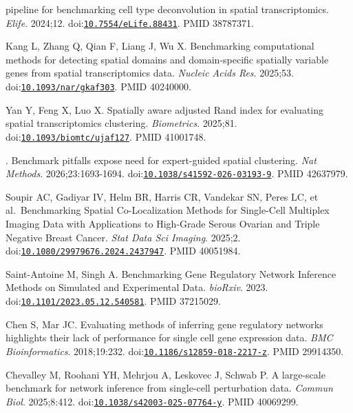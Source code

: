 \documentclass[11pt]{article}
\begin{document}
\begin{enumerate}[label={[\arabic*]},leftmargin=2.6em,labelsep=0.5em,itemsep=1.5pt]
  pipeline for benchmarking cell type deconvolution in spatial
  transcriptomics. \emph{Elife}. 2024;12.
  doi:\href{https://doi.org/10.7554/eLife.88431}{\nolinkurl{10.7554/eLife.88431}}.
  PMID 38787371.
\item
  Kang L, Zhang Q, Qian F, Liang J, Wu X. Benchmarking computational
  methods for detecting spatial domains and domain-specific spatially
  variable genes from spatial transcriptomics data. \emph{Nucleic Acids
  Res}. 2025;53.
  doi:\href{https://doi.org/10.1093/nar/gkaf303}{\nolinkurl{10.1093/nar/gkaf303}}.
  PMID 40240000.
\item
  Yan Y, Feng X, Luo X. Spatially aware adjusted Rand index for
  evaluating spatial transcriptomics clustering. \emph{Biometrics}.
  2025;81.
  doi:\href{https://doi.org/10.1093/biomtc/ujaf127}{\nolinkurl{10.1093/biomtc/ujaf127}}.
  PMID 41001748.
\item
  . Benchmark pitfalls expose need for expert-guided spatial clustering.
  \emph{Nat Methods}. 2026;23:1693-1694.
  doi:\href{https://doi.org/10.1038/s41592-026-03193-9}{\nolinkurl{10.1038/s41592-026-03193-9}}.
  PMID 42637979.
\item
  Soupir AC, Gadiyar IV, Helm BR, Harris CR, Vandekar SN, Peres LC, et
  al.~Benchmarking Spatial Co-Localization Methods for Single-Cell
  Multiplex Imaging Data with Applications to High-Grade Serous Ovarian
  and Triple Negative Breast Cancer. \emph{Stat Data Sci Imaging}.
  2025;2.
  doi:\href{https://doi.org/10.1080/29979676.2024.2437947}{\nolinkurl{10.1080/29979676.2024.2437947}}.
  PMID 40051984.
\item
  Saint-Antoine M, Singh A. Benchmarking Gene Regulatory Network
  Inference Methods on Simulated and Experimental Data. \emph{bioRxiv}.
  2023.
  doi:\href{https://doi.org/10.1101/2023.05.12.540581}{\nolinkurl{10.1101/2023.05.12.540581}}.
  PMID 37215029.
\item
  Chen S, Mar JC. Evaluating methods of inferring gene regulatory
  networks highlights their lack of performance for single cell gene
  expression data. \emph{BMC Bioinformatics}. 2018;19:232.
  doi:\href{https://doi.org/10.1186/s12859-018-2217-z}{\nolinkurl{10.1186/s12859-018-2217-z}}.
  PMID 29914350.
\item
  Chevalley M, Roohani YH, Mehrjou A, Leskovec J, Schwab P. A
  large-scale benchmark for network inference from single-cell
  perturbation data. \emph{Commun Biol}. 2025;8:412.
  doi:\href{https://doi.org/10.1038/s42003-025-07764-y}{\nolinkurl{10.1038/s42003-025-07764-y}}.
  PMID 40069299.
\item

\end{enumerate}
\end{document}
